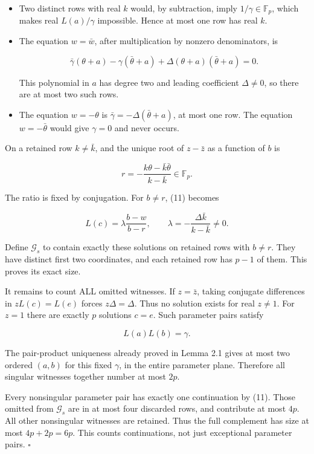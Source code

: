 \documentclass[11pt,a4paper]{article}
\begin{document}
\begin{itemize}
\item
  Two distinct rows with real \(k\) would, by subtraction, imply \(1/\gamma\in\mathbb F_p\), which makes real \(L(a)/\gamma\) impossible. Hence at most one row has real \(k\).
\item
  The equation \(w=\bar w\), after multiplication by nonzero denominators, is

  \[\bar\gamma(\theta+a)-\gamma(\bar\theta+a)
       +\Delta(\theta+a)(\bar\theta+a)=0.\]

  This polynomial in \(a\) has degree two and leading coefficient \(\Delta\ne0\), so there are at most two such rows.
\item
  The equation \(w=-\theta\) is \(\bar\gamma=-\Delta(\bar\theta+a)\), at most one row. The equation \(w=-\bar\theta\) would give \(\gamma=0\) and never occurs.
\end{itemize}

On a retained row \(k\ne\bar k\), and the unique root of \(z-\bar z\) as a function of \(b\) is

\[r=-\frac{k\theta-\bar k\bar\theta}{k-\bar k}\in\mathbb F_p.\]

The ratio is fixed by conjugation. For \(b\ne r\), (11) becomes

\[L(c)=\lambda\frac{b-w}{b-r},\qquad
\lambda=-\frac{\Delta\bar k}{k-\bar k}\ne0.
\tag{12}\]

Define \(\mathcal G_s\) to contain exactly these solutions on retained rows with \(b\ne r\). They have distinct first two coordinates, and each retained row has \(p-1\) of them. This proves its exact size.

It remains to count ALL omitted witnesses. If \(z=\bar z\), taking conjugate differences in \(zL(c)=L(e)\) forces \(z\Delta=\Delta\). Thus no solution exists for real \(z\ne1\). For \(z=1\) there are exactly \(p\) solutions \(c=e\). Such parameter pairs satisfy

\[L(a)L(b)=\gamma.\]

The pair-product uniqueness already proved in Lemma 2.1 gives at most two ordered \((a,b)\) for this fixed \(\gamma\), in the entire parameter plane. Therefore all singular witnesses together number at most \(2p\).

Every nonsingular parameter pair has exactly one continuation by (11). Those omitted from \(\mathcal G_s\) are in at most four discarded rows, and contribute at most \(4p\). All other nonsingular witnesses are retained. Thus the full complement has size at most \(4p+2p=6p\). This counts continuations, not just exceptional parameter pairs. \hfill\(\square\)
\end{document}
